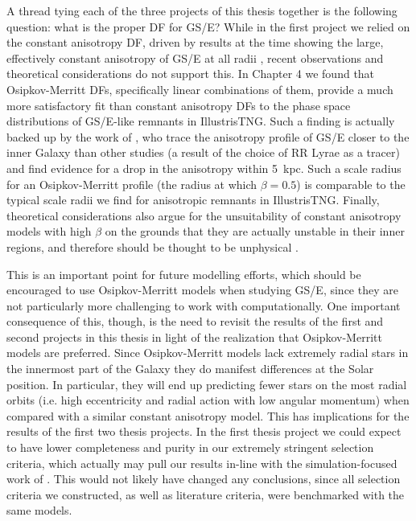 A thread tying each of the three projects of this thesis together is the following question: what is the proper DF for GS/E? While in the first project we relied on the constant anisotropy DF, driven by results at the time showing the large, effectively constant anisotropy of GS/E at all radii \parencite[e.g.][]{belokurov18,lancaster19}, recent observations and theoretical considerations do not support this. In Chapter 4 we found that Osipkov-Merritt DFs, specifically linear combinations of them, provide a much more satisfactory fit than constant anisotropy DFs to the phase space distributions of GS/E-like remnants in IllustrisTNG. Such a finding is actually backed up by the work of \textcite{iorio21}, who trace the anisotropy profile of GS/E closer to the inner Galaxy than other studies (a result of the choice of RR Lyrae as a tracer) and find evidence for a drop in the anisotropy within 5~kpc. Such a scale radius for an Osipkov-Merritt profile (the radius at which $\beta=0.5$) is comparable to the typical scale radii we find for anisotropic remnants in IllustrisTNG. Finally, theoretical considerations also argue for the unsuitability of constant anisotropy models with high $\beta$ on the grounds that they are actually unstable in their inner regions, and therefore should be thought to be unphysical \parencite[see][and references therein]{binney14d}.

This is an important point for future modelling efforts, which should be encouraged to use Osipkov-Merritt models when studying GS/E, since they are not particularly more challenging to work with computationally. One important consequence of this, though, is the need to revisit the results of the first and second projects in this thesis in light of the realization that Osipkov-Merritt models are preferred. Since Osipkov-Merritt models lack extremely radial stars in the innermost part of the Galaxy they do manifest differences at the Solar position. In particular, they will end up predicting fewer stars on the most radial orbits (i.e. high eccentricity and radial action with low angular momentum) when compared with a similar constant anisotropy model. This has implications for the results of the first two thesis projects. In the first thesis project we could expect to have lower completeness and purity in our extremely stringent selection criteria, which actually may pull our results in-line with the simulation-focused work of \textcite{carrillo23}. This would not likely have changed any conclusions, since all selection criteria we constructed, as well as literature criteria, were benchmarked with the same models.

